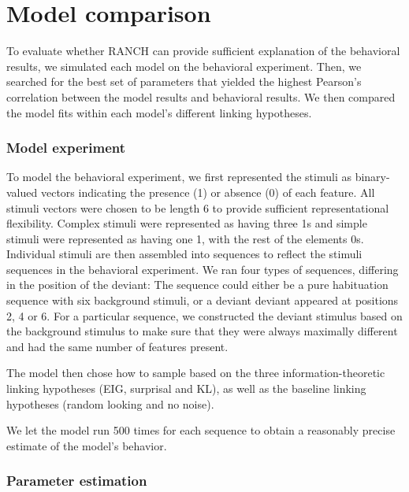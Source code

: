 \documentclass[10pt, letterpaper]{article}
\begin{document}
\hypertarget{model-comparison}{%
\section{Model comparison}\label{model-comparison}}

To evaluate whether RANCH can provide sufficient explanation of the
behavioral results, we simulated each model on the behavioral
experiment. Then, we searched for the best set of parameters that
yielded the highest Pearson's correlation between the model results and
behavioral results. We then compared the model fits within each model's
different linking hypotheses.

\hypertarget{model-experiment}{%
\subsubsection{Model experiment}\label{model-experiment}}

To model the behavioral experiment, we first represented the stimuli as
binary-valued vectors indicating the presence (1) or absence (0) of each
feature. All stimuli vectors were chosen to be length 6 to provide
sufficient representational flexibility. Complex stimuli were
represented as having three 1s and simple stimuli were represented as
having one 1, with the rest of the elements 0s. Individual stimuli are
then assembled into sequences to reflect the stimuli sequences in the
behavioral experiment. We ran four types of sequences, differing in the
position of the deviant: The sequence could either be a pure habituation
sequence with six background stimuli, or a deviant deviant appeared at
positions 2, 4 or 6. For a particular sequence, we constructed the
deviant stimulus based on the background stimulus to make sure that they
were always maximally different and had the same number of features
present.

The model then chose how to sample based on the three
information-theoretic linking hypotheses (EIG, surprisal and KL), as
well as the baseline linking hypotheses (random looking and no noise).

We let the model run 500 times for each sequence to obtain a reasonably
precise estimate of the model's behavior.

\hypertarget{parameter-estimation}{%
\subsubsection{Parameter estimation}\label{parameter-estimation}}
\end{document}
